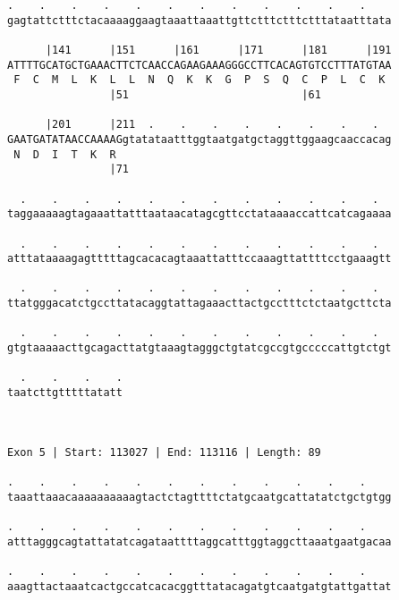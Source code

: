 \documentclass{article}
\begin{document}
\begin{Verbatim}
.    .    .    .    .    .    .    .    .    .    .    .    
gagtattctttctacaaaaggaagtaaattaaattgttctttctttctttataatttata
                                                            
      |141      |151      |161      |171      |181      |191
ATTTTGCATGCTGAAACTTCTCAACCAGAAGAAAGGGCCTTCACAGTGTCCTTTATGTAA
 F  C  M  L  K  L  L  N  Q  K  K  G  P  S  Q  C  P  L  C  K 
                |51                           |61           
  
      |201      |211  .    .    .    .    .    .    .    .  
GAATGATATAACCAAAAGgtatataatttggtaatgatgctaggttggaagcaaccacag
 N  D  I  T  K  R                                           
                |71                                         
  
  .    .    .    .    .    .    .    .    .    .    .    .  
taggaaaaagtagaaattatttaataacatagcgttcctataaaaccattcatcagaaaa
                                                            
  .    .    .    .    .    .    .    .    .    .    .    .  
atttataaaagagtttttagcacacagtaaattatttccaaagttattttcctgaaagtt
                                                            
  .    .    .    .    .    .    .    .    .    .    .    .  
ttatgggacatctgccttatacaggtattagaaacttactgcctttctctaatgcttcta
                                                            
  .    .    .    .    .    .    .    .    .    .    .    .  
gtgtaaaaacttgcagacttatgtaaagtagggctgtatcgccgtgcccccattgtctgt
                                                            
  .    .    .    .
taatcttgtttttatatt
                  
                  
 
Exon 5 | Start: 113027 | End: 113116 | Length: 89
 
.    .    .    .    .    .    .    .    .    .    .    .    
taaattaaacaaaaaaaaaagtactctagttttctatgcaatgcattatatctgctgtgg
                                                            
.    .    .    .    .    .    .    .    .    .    .    .    
atttagggcagtattatatcagataattttaggcatttggtaggcttaaatgaatgacaa
                                                            
.    .    .    .    .    .    .    .    .    .    .    .    
aaagttactaaatcactgccatcacacggtttatacagatgtcaatgatgtattgattat
                                                            

\end{Verbatim}
\end{document}
